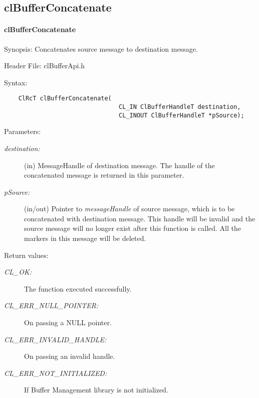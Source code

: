 \subsection{clBufferConcatenate}
\hypertarget{pagebuf116}{}\paragraph{cl\-Buffer\-Concatenate}\label{pagebuf116}
\begin{Desc}
\item[Synopsis:]Concatenates source message to destination message.\end{Desc}
\begin{Desc}
\item[Header File:]clBufferApi.h\end{Desc}
\begin{Desc}
\item[Syntax:]

\footnotesize\begin{verbatim}    ClRcT clBufferConcatenate(
                         		CL_IN ClBufferHandleT destination,
                         		CL_INOUT ClBufferHandleT *pSource);
\end{verbatim}
\normalsize
\end{Desc}
\begin{Desc}
\item[Parameters:]
\begin{description}
\item[{\em destination:}](in) Message\-Handle of destination message. The handle of the concatenated message is returned in this parameter. 
\item[{\em p\-Source:}](in/out) Pointer to {\em message\-Handle\/} of source message, which is to be concatenated with destination message. This handle 
will be invalid and the source message will no longer exist after this function is called. All the markers in this message will be deleted.
\end{description}
\end{Desc}
\begin{Desc}
\item[Return values:]
\begin{description}
\item[{\em CL\_\-OK:}]The function executed successfully. 
\item[{\em CL\_\-ERR\_\-NULL\_\-POINTER:}]On passing a NULL pointer. 
\item[{\em CL\_\-ERR\_\-INVALID\_\-HANDLE:}]On passing an invalid handle. 
\item[{\em CL\_\-ERR\_\-NOT\_\-INITIALIZED:}]If Buffer Management library is not initialized.\end{description}
\end{Desc}
